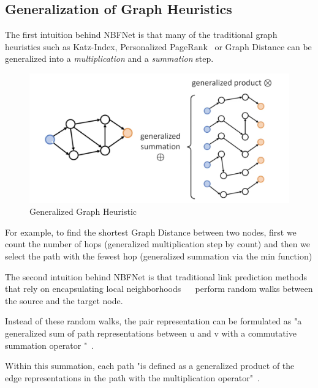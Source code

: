 \subsection{Generalization of Graph Heuristics}\label{subsec:generalization-of-graph-heuristics}

The first intuition behind NBFNet is that many of the traditional graph heuristics such as Katz-Index, Personalized PageRank~\cite{Page1998PageRank}
or Graph Distance can be generalized into a \textit{multiplication} and a \textit{summation} step.

\begin{figure}[h] %
    \centering %
    \includegraphics[width=0.8\linewidth]{figures/nbfnet-trad} %
    \caption{Generalized Graph Heuristic ~\cite{NBfnetPres}} %
    \label{fig:nbfnet-trad} %
\end{figure}

For example, to find the shortest Graph Distance between two nodes, first we count the number of hops (generalized multiplication step by count) and then we select
the path with the fewest hop (generalized summation via the min function)

The second intuition behind NBFNet is that traditional link prediction methods that rely on encapsulating local neighborhoods~ ~\cite{RandomWalks, SubgraphExtraction}
perform random walks between the source and the target node.

Instead of these random walks, the pair representation can be formulated as "a generalized sum of path representations between u and v with a commutative
summation operator \bigoplus"~\cite{NBFNet}.

Within this summation, each path "is defined as a generalized product of the edge
representations in the path with the multiplication operator"~\cite{NBFNet}.

